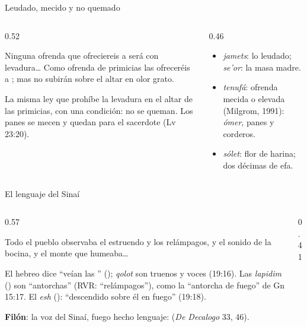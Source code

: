 \begin{frame}{Leudado, mecido y no quemado}
\begin{columns}[t,onlytextwidth]
\begin{column}{0.52\textwidth}
\begin{cita}Ninguna ofrenda que ofreciereis a \SENOR{} será con levadura\ldots{} Como ofrenda de primicias las ofreceréis a \SENOR; mas no subirán sobre el altar en olor grato.\end{cita}
\scriptsize\RaggedRight La misma ley que prohíbe la levadura en el altar  de las primicias, con una condición: no se queman. Los panes se mecen y quedan para el sacerdote (Lv 23:20).
\end{column}
\begin{column}{0.46\textwidth}\small
\begin{itemize}
\item {} \emph{jamets}: lo leudado;  \emph{se'or}: la masa madre.
\item {} \emph{tenufá}: ofrenda mecida o elevada (Milgrom, 1991): \emph{ómer}, panes y corderos.
\item {} \emph{sólet}: flor de harina; dos décimas de efa.
\end{itemize}
\end{column}
\end{columns}
\end{frame}

\begin{frame}{El lenguaje del Sinaí}
\begin{columns}[c,onlytextwidth]
\begin{column}{0.57\textwidth}
\begin{cita}Todo el pueblo observaba el estruendo y los relámpagos, y el sonido de la bocina, y el monte que humeaba\ldots{}\end{cita}
\scriptsize\RaggedRight
El hebreo dice ``veían las '' (); \emph{qolot} son truenos y voces (19:16). Las \emph{lapidim} () son ``antorchas'' (RVR: ``relámpagos''), como la ``antorcha de fuego'' de Gn 15:17. El \emph{esh} (): ``descendido sobre él en fuego'' (19:18).\par\smallskip
\textbf{Filón}: la voz del Sinaí, fuego hecho lenguaje:  (\emph{De Decalogo} 33, 46).
\end{column}
\begin{column}{0.41\textwidth}\end{column}
\end{columns}
\end{frame}

